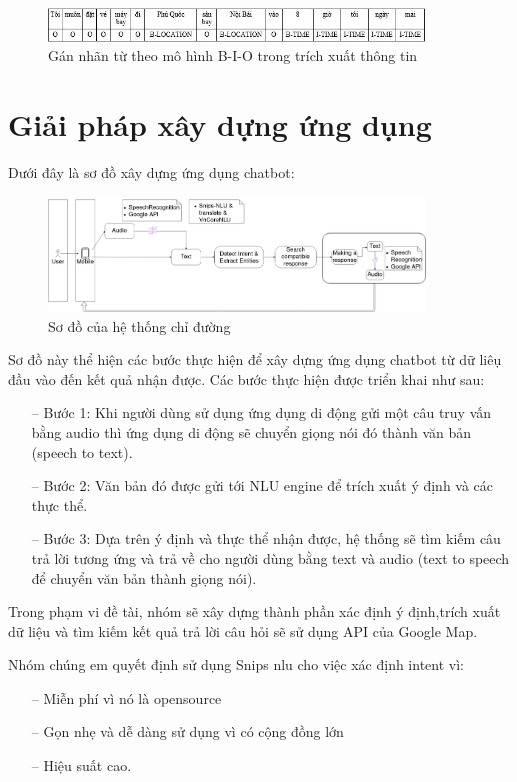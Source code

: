 \begin{figure}[htp]
    \centering
    \includegraphics[width=10cm]{images/Model-BIO.png}
    \caption{Gán nhãn từ theo mô hình B-I-O trong trích xuất thông tin}
    \label{fig:model-BIO}
\end{figure}

\section{Giải pháp xây dựng ứng dụng}
Dưới đây là sơ đồ xây dựng ứng dụng chatbot:
\begin{figure}[htp]
    \centering
    \includegraphics[width=10cm]{images/Structure-description.png}
    \caption{Sơ đồ của hệ thống chỉ đường}
    \label{fig:sodohethongchiduong}

\end{figure}

Sơ đồ này thể hiện các bước thực hiện để xây dựng ứng dụng chatbot từ dữ liêụ đầu vào đến kết quả nhận được. Các bước thực hiện được triển khai như sau:
\begin{itemize}
    \item[--] Bước 1: Khi người dùng sử dụng ứng dụng di động gửi một câu truy vấn bằng audio thì ứng dụng di động sẽ chuyển giọng nói đó thành văn bản (speech to text).
    \item[--] Bước 2: Văn bản đó được gửi tới NLU engine để trích xuất ý định và các thực thể.
    \item[--] Bước 3: Dựa trên ý định và thực thể nhận được, hệ thống sẽ tìm kiếm câu trả lời tương ứng và trả về cho người dùng bằng text và audio (text to speech để chuyển văn bản thành giọng nói).
\end{itemize}
Trong phạm vi đề tài, nhóm sẽ xây dựng thành phần xác định ý định,trích xuất dữ liệu và tìm kiếm kết quả trả lời câu hỏi sẽ sử dụng API của Google Map.

Nhóm chúng em quyết định sử dụng Snips \ac{nlu} cho việc xác định intent vì:
\begin{itemize}
    \item[--] Miễn phí vì nó là opensource
    \item[--] Gọn nhẹ và dễ dàng sử dụng vì có cộng đồng lớn
    \item[--] Hiệu suất cao.
\end{itemize}

